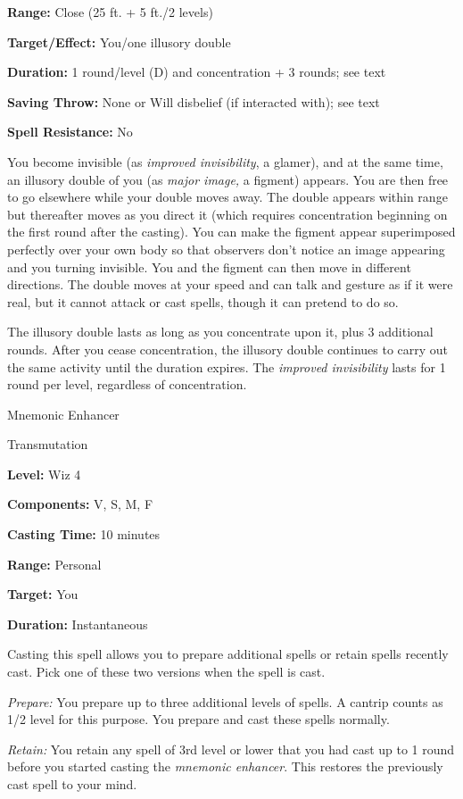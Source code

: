 \documentclass{article}
\begin{document}
\textbf{Range:} Close (25 ft. + 5 ft./2 levels)

\textbf{Target/Effect:} You/one illusory double

\textbf{Duration:} 1 round/level (D) and concentration + 3 rounds; see text

\textbf{Saving Throw:} None or Will disbelief (if interacted with); see text

\textbf{Spell Resistance:} No

You become invisible (as \textit{improved invisibility}, a glamer), and at the 
same time, an illusory double of you (as \textit{major image, }a figment) appears. 
You are then free to go elsewhere while your double moves away. The double appears 
within range but thereafter moves as you direct it (which requires concentration 
beginning on the first round after the casting). You can make the figment appear 
superimposed perfectly over your own body so that observers don't notice an image 
appearing and you turning invisible. You and the figment can then move in different 
directions. The double moves at your speed and can talk and gesture as if it were 
real, but it cannot attack or cast spells, though it can pretend to do so.

The illusory double lasts as long as you concentrate upon it, plus 3 additional 
rounds. After you cease concentration, the illusory double continues to carry out 
the same activity until the duration expires. The \textit{improved invisibility 
}lasts for 1 round per level, regardless of concentration.

\vspace{12pt}
Mnemonic Enhancer

Transmutation

\textbf{Level: }Wiz 4

\textbf{Components:} V, S, M, F

\textbf{Casting Time:} 10 minutes

\textbf{Range:} Personal

\textbf{Target:} You

\textbf{Duration:} Instantaneous

Casting this spell allows you to prepare additional spells or retain spells recently 
cast. Pick one of these two versions when the spell is cast.

\textit{Prepare: }You prepare up to three additional levels of spells. A cantrip 
counts as 1/2 level for this purpose. You prepare and cast these spells normally.

\textit{Retain: }You retain any spell of 3rd level or lower that you had cast up 
to 1 round before you started casting the \textit{mnemonic enhancer}. This restores 
the previously cast spell to your mind.
\end{document}
